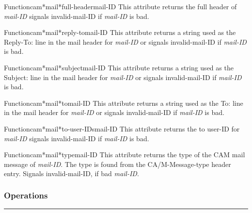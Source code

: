 \begin{functiondoc}{Function}{cam*mail*full-header}{mail-ID}
This attribute returns the full header of {\em mail-ID} signals 
invalid-mail-ID if {\em mail-ID} is bad.
\end{functiondoc}

\begin{functiondoc}{Function}{cam*mail*reply-to}{mail-ID}
This attribute returns a string used as the Reply-To: line in the mail header for
{\em mail-ID} or signals invalid-mail-ID if {\em mail-ID} is bad.
\end{functiondoc}

\begin{functiondoc}{Function}{cam*mail*subject}{mail-ID}
This attribute returns a string used as the Subject: line in the mail header for
{\em mail-ID} or signals invalid-mail-ID if {\em mail-ID} is bad.
\end{functiondoc}

\begin{functiondoc}{Function}{cam*mail*to}{mail-ID}
This attribute returns a string used as the To: line in the mail header for
{\em mail-ID} or signals invalid-mail-ID if {\em mail-ID} is bad.
\end{functiondoc}

\begin{functiondoc}{Function}{cam*mail*to-user-IDs}{mail-ID}
This attribute returns the to user-ID for {\em mail-ID} signals 
invalid-mail-ID if {\em mail-ID} is bad.
\end{functiondoc}

\begin{functiondoc}{Function}{cam*mail*type}{mail-ID}
This attribute returns the type of the CAM mail message of {\em mail-ID}.
The type is found from the CA/M-Message-type header entry.
Signals invalid-mail-ID, if bad {\em mail-ID}.
\end{functiondoc}


\subsubsection*{Operations}
\par\vspace*{0.00in}\par\hrule\par\medskip\par


